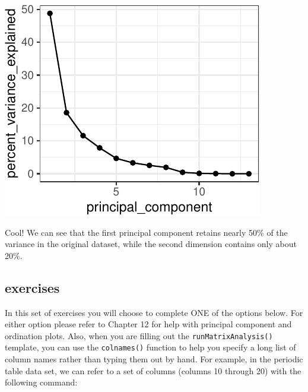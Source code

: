 \documentclass[
]{krantz}
\begin{document}
\begin{center}\includegraphics[width=1\linewidth]{index_files/figure-latex/unnamed-chunk-101-1} \end{center}

Cool! We can see that the first principal component retains nearly 50\% of the variance in the original dataset, while the second dimension contains only about 20\%.

\hypertarget{exercises-4}{%
\subsection{exercises}\label{exercises-4}}

In this set of exercises you will choose to complete ONE of the options below. For either option please refer to Chapter 12 for help with principal component and ordination plots. Also, when you are filling out the \texttt{runMatrixAnalysis()} template, you can use the \texttt{colnames()} function to help you specify a long list of column names rather than typing them out by hand. For example, in the periodic table data set, we can refer to a set of columns (columns 10 through 20) with the following command:
\end{document}
